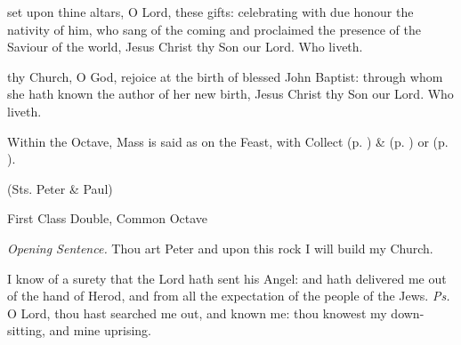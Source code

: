 
\secret\label{JohnSecret}
 set upon thine altars, O Lord, these gifts: celebrating with due honour the nativity of him, who sang of the coming and proclaimed the presence of the Saviour of the world, Jesus Christ thy Son our Lord. Who liveth.


\postcommunion\label{JohnPC}
 thy Church, O God, rejoice at the birth of blessed John Baptist: through whom she hath known the author of her new birth, Jesus Christ thy Son our Lord. Who liveth.
\begin{rubric}
    Within the Octave, Mass is said as on the Feast, with  Collect  (p. \pageref{SPMaryInEaster}) \&   (p. \pageref{SPAgainst}) or  (p. \pageref{SPChiefBishop}).
\end{rubric}


%
  

\centerline{\small{(Sts. Peter \& Paul)}}

\begin{inhead}
    {First Class Double, Common Octave}
\end{inhead}
\par\noindent
\textit{Opening Sentence.} Thou art Peter and upon this rock I will build my Church.

\introit
{} I know of a surety that the Lord hath sent his Angel: and hath delivered me out of the hand of Herod, and from all the expectation of the people of the Jews. \textit{Ps.} O Lord, thou hast searched me out, and known me: thou knowest my down-sitting, and mine uprising.

